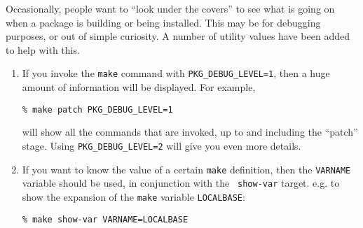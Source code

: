 %
%

Occasionally, people want to ``look under the covers'' to see  what is going on
when a  package  is building  or being  installed.  This may  be for  debugging
purposes, or  out  of simple curiosity. A  number  of utility values have  been
added to help with this.

\begin{enumerate}

\item If you invoke the {\tt make} command with {\tt PKG\_DEBUG\_LEVEL=1}, then
      a huge amount of information will be displayed. For example,

\begin{verbatim}
% make patch PKG_DEBUG_LEVEL=1
\end{verbatim}

      will show all the commands that are invoked, up to and including the
      ``patch'' stage. Using {\tt PKG\_DEBUG\_LEVEL=2} will give you even
      more details.

\item If you want to know the value of a certain {\tt make} definition, then
   the {\tt VARNAME} variable   should be used,  in  conjunction with the  {\tt
   show-var} target.  e.g.  to show the  expansion  of the  {\tt make} variable
   {\tt LOCALBASE}:

\begin{verbatim}
% make show-var VARNAME=LOCALBASE
\end{verbatim}

\end{enumerate}



